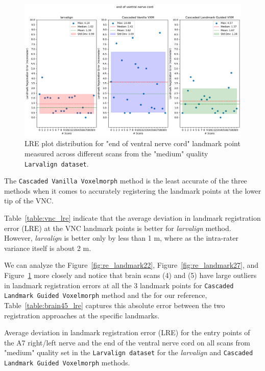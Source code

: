 \documentclass{book}
\begin{document}
	\begin{figure}[h!]
		\centering
		\includegraphics[width=0.75\columnwidth]{resources/chapter5_fresh/output/end of ventral nerve cord.png}
		\caption{LRE plot distribution for "end of ventral nerve cord" landmark point measured across different scans from the "medium" quality \texttt{Larvalign dataset}.}
		\label{fig:re_landmark15}
	\end{figure}
	
	The \texttt{Cascaded Vanilla Voxelmorph} method is the least accurate of the three methods when it comes to accurately registering the landmark points at the lower tip of the VNC.
	
	Table~\ref{table:vnc_lre} indicate that the average deviation in landmark registration error (LRE) at the VNC landmark points is better for \textit{larvalign} method. However, \emph{larvalign} is better only by less than 1 \textmu m, where as the intra-rater variance itself is about 2 \textmu m.
	
	We can analyze the Figure~\ref{fig:re_landmark22}, Figure~\ref{fig:re_landmark27}, and Figure~\ref{fig:re_landmark15} more closely and notice that brain scans (4) and (5) have large outliers in landmark registration errors at all the 3 landmark points for \texttt{Cascaded Landmark Guided Voxelmorph} method and the for our reference, Table~\ref{table:brain45_lre} captures this absolute error between the two registration approaches at the specific landmarks.
	
	\begin{table}[h!]
		\centering
		
		\caption{Average deviation in landmark registration error (LRE) for the entry points of the A7 right/left nerve and the end of the ventral nerve cord on all scans from "medium" quality set in the \texttt{Larvalign dataset} for the \textit{larvalign} and \texttt{Cascaded Landmark Guided Voxelmorph} methods.}
		\label{table:vnc_lre}
	\end{table}
	
\end{document}

